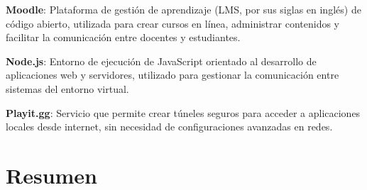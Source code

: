 \documentclass[letter,oneside,12pt,spanish]{report}
\begin{document}
\begin{description}
\item \textbf{Moodle}: Plataforma de gestión de aprendizaje (LMS, por sus siglas en inglés) de código abierto, utilizada para crear cursos en línea, administrar contenidos y facilitar la comunicación entre docentes y estudiantes.
\item \textbf{Node.js}: Entorno de ejecución de JavaScript orientado al desarrollo de aplicaciones web y servidores, utilizado para gestionar la comunicación entre sistemas del entorno virtual.
\item \textbf{Playit.gg}: Servicio que permite crear túneles seguros para acceder a aplicaciones locales desde internet, sin necesidad de configuraciones avanzadas en redes.

\end{description}


\newpage

\newpage

\chapter*{Resumen}
\end{document}

